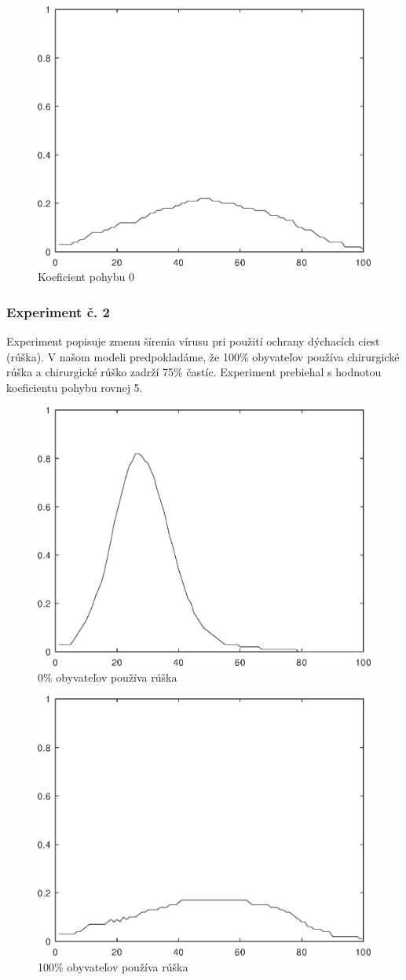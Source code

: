 \documentclass[11pt,a4paper,titlepage]{article}
\begin{document}
\begin{figure}[h!]
    \center
    \includegraphics[width=.39\linewidth]{movement-rate-0.eps}
    \caption{Koeficient pohybu 0}
\end{figure}

\subsubsection{Experiment č. 2}
Experiment popisuje zmenu šírenia vírusu pri použití ochrany dýchacích ciest (rúška). V našom modeli predpokladáme, že 100\% obyvateľov používa chirurgické rúška a chirurgické rúško zadrží 75\% častíc.\cite{Masks}
Experiment prebiehal s hodnotou koeficientu pohybu rovnej 5.

\begin{figure}[h!]
    \center
    \includegraphics[width=.39\linewidth]{movement5transmission0,059.eps}
    \caption{0\% obyvateľov používa rúška}
\end{figure}

\begin{figure}[h!]
    \centering
    \includegraphics[width=.39\linewidth]{movement5transmission0,01475.eps}
    \caption{100\% obyvateľov používa rúška}
\end{figure}
\end{document}
